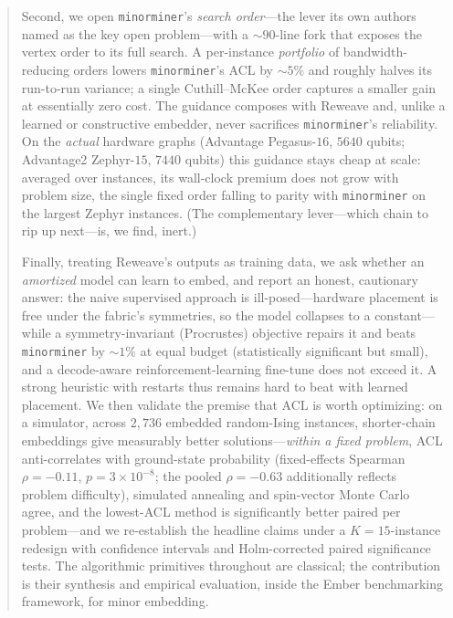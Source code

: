 \documentclass[acmsmall,anonymous,nonacm]{acmart}
\begin{document}
\begin{abstract}
Second, we open \texttt{minorminer}'s \emph{search order}---the lever its own
authors named as the key open problem---with a ${\sim}90$-line fork that exposes
the vertex order to its full search. A per-instance \emph{portfolio} of
bandwidth-reducing orders lowers \texttt{minorminer}'s ACL by ${\sim}5\%$ and
roughly halves its run-to-run variance; a single Cuthill--McKee order captures a
smaller gain at essentially zero cost. The guidance composes with Reweave
and, unlike a learned or constructive embedder, never sacrifices
\texttt{minorminer}'s reliability. On the \emph{actual} hardware graphs (Advantage
Pegasus-$16$, $5640$ qubits; Advantage2 Zephyr-$15$, $7440$ qubits) this guidance
stays cheap at scale: averaged over instances, its wall-clock premium does not grow
with problem size, the single fixed order falling to parity with \texttt{minorminer}
on the largest Zephyr instances.
(The complementary lever---which chain to rip up next---is, we find, inert.)

Finally, treating Reweave's outputs as training data, we ask whether an
\emph{amortized} model can learn to embed, and report an honest, cautionary
answer: the naive supervised approach is ill-posed---hardware placement is free
under the fabric's symmetries, so the model collapses to a constant---while a
symmetry-invariant (Procrustes) objective repairs it and beats \texttt{minorminer}
by ${\sim}1\%$ at equal budget (statistically significant but small), and a
decode-aware reinforcement-learning fine-tune does not exceed it. A strong
heuristic with restarts thus remains hard to beat with learned placement. We then
validate the premise that ACL is worth optimizing: on a simulator, across $2{,}736$
embedded random-Ising instances, shorter-chain embeddings give measurably better
solutions---\emph{within a fixed problem}, ACL anti-correlates with ground-state
probability (fixed-effects Spearman $\rho=-0.11$, $p=3{\times}10^{-8}$; the pooled
$\rho=-0.63$ additionally reflects problem difficulty), simulated annealing and
spin-vector Monte Carlo agree, and the lowest-ACL method is significantly better
paired per problem---and we re-establish the headline claims under a
$K{=}15$-instance redesign with confidence intervals and Holm-corrected paired
significance tests. The algorithmic
primitives throughout are classical; the contribution is their synthesis and
empirical evaluation, inside the Ember benchmarking framework, for minor embedding.
\end{abstract}

\end{document}
